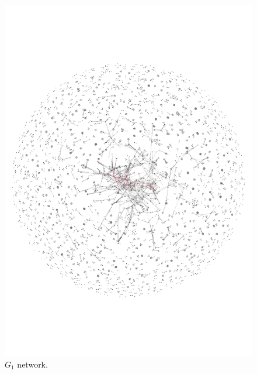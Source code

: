 \documentclass{article}
\theoremstyle{definition}
\begin{document}
\begin{figure}[!hbtp]
    \begin{minipage}{.45\textwidth}
        \centering
        \includegraphics[width=.9\textwidth]{./assets/pd_network.pdf}
        \caption{\(G_1\) network.}\label{fig:g_one_network}
    \end{minipage}
    \begin{minipage}{.45\textwidth}
        \centering

\end{minipage}
\end{figure}
\end{document}
